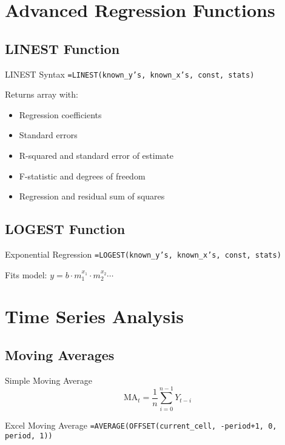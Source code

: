 \documentclass[12pt,a4paper]{book}
\begin{document}
{{\section{Advanced Regression Functions}

\subsection{LINEST Function}

\begin{definition}{LINEST Syntax}
\texttt{=LINEST(known\_y's, known\_x's, const, stats)}

Returns array with:
\begin{itemize}
    \item Regression coefficients
    \item Standard errors
    \item R-squared and standard error of estimate
    \item F-statistic and degrees of freedom
    \item Regression and residual sum of squares
\end{itemize}
\end{definition}

\subsection{LOGEST Function}

\begin{definition}{Exponential Regression}
\texttt{=LOGEST(known\_y's, known\_x's, const, stats)}

Fits model: $y = b \cdot m_1^{x_1} \cdot m_2^{x_2} \cdots$
\end{definition}

\section{Time Series Analysis}

\subsection{Moving Averages}

\begin{definition}{Simple Moving Average}
\[
\text{MA}_t = \frac{1}{n} \sum_{i=0}^{n-1} Y_{t-i}
\]
\end{definition}

\begin{example}{Excel Moving Average}
\texttt{=AVERAGE(OFFSET(current\_cell, -period+1, 0, period, 1))}
\end{example}

}}
\end{document}
